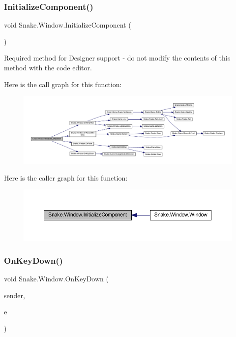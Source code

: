 \subsubsection{\texorpdfstring{Initialize\+Component()}{InitializeComponent()}}
{\footnotesize\ttfamily void Snake.\+Window.\+Initialize\+Component (\begin{DoxyParamCaption}{ }\end{DoxyParamCaption})\hspace{0.3cm}{\ttfamily [private]}}



Required method for Designer support -\/ do not modify the contents of this method with the code editor. 

Here is the call graph for this function\+:
\nopagebreak
\begin{figure}[H]
\begin{center}
\leavevmode
\includegraphics[width=350pt]{d8/dae/class_snake_1_1_window_a2291066b4718678884b7d69ae8360407_cgraph}
\end{center}
\end{figure}
Here is the caller graph for this function\+:
\nopagebreak
\begin{figure}[H]
\begin{center}
\leavevmode
\includegraphics[width=350pt]{d8/dae/class_snake_1_1_window_a2291066b4718678884b7d69ae8360407_icgraph}
\end{center}
\end{figure}
\mbox{\label{class_snake_1_1_window_af4974962d6658e8225bd9b840a3fca32}} 
\subsubsection{\texorpdfstring{On\+Key\+Down()}{OnKeyDown()}}
{\footnotesize\ttfamily void Snake.\+Window.\+On\+Key\+Down (\begin{DoxyParamCaption}\item[{object}]{sender,  }\item[{Key\+Event\+Args}]{e }\end{DoxyParamCaption})\hspace{0.3cm}{\ttfamily [private]}}



